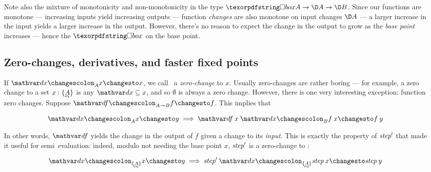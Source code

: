 

Note also the mixture of monotonicity and non-monotonicity in the type $\iso A
\to \D A \to \D B$. Since our functions are monotone --- increasing inputs yield
increasing outputs --- function \emph{changes} are also monotone on input
changes $\D A$ --- a larger increase in the input yields a larger increase in
the output. However, there's no reason to expect the change in the output to
grow as the \emph{base point} increases --- hence the $\iso$ on the base point.


\subsection{Zero-changes, derivatives, and faster fixed points}
\label{sec:derivatives}

If $\changesat A \dx x x$, we call \dx\ a \emph{zero-change} to $x$. Usually
zero-changes are rather boring --- for example, a zero change to a set $x :
\tseteq{A}$ is any $\dx \subseteq x$, and so $\emptyset$ is always a zero
change.
%
However, there is one very interesting exception: function zero changes. Suppose
$\changesat{A \to B}{\df}{f}{f}$. This implies that

\begin{equation}\label{eqn:derivative}
  \changesat A \dx x y \implies \changesat B{\df\<x\<\dx}{f\<x}{f\<y}
\end{equation}

\noindent
In other words, $\df$ yields the change in the output of $f$ given a change to
its \emph{input}.
%
This is exactly the property of $\text{\itshape step}'$ that made it useful for
semi\naive\ evaluation: indeed, modulo not needing the base point $x$,
$\text{\itshape step}'$ is a zero-change to :

\[ \changesat{\tseteq A} \dx x y \implies
\changesat{\tseteq A}{\name{step}'\<\dx}{\name{step}\<x}{\name{step}\<y}
\]

